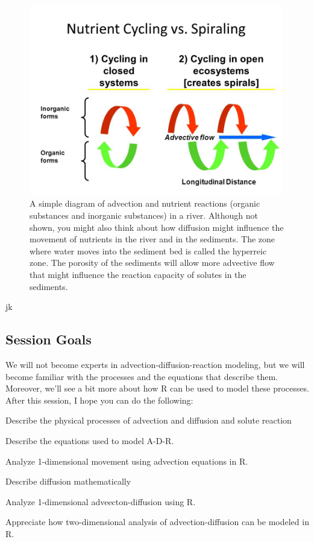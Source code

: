 \documentclass{tufte-handout}\usepackage[]{graphicx}\usepackage[]{xcolor}
\newenvironment{enumerate*}%
  {\begin{enumerate}%
    \setlength{\itemsep}{0pt}%
    \setlength{\parskip}{0pt}}%
  {\end{enumerate}}
\begin{document}
\begin{figure}
\caption{A simple diagram of advection and nutrient reactions (organic substances and inorganic substances) in a river. Although not shown, you might also think about how diffusion might influence the movement of nutrients in the river and in the sediments.  
The zone where water moves into the sediment bed is called the hyperreic zone. The porosity of the sediments will allow more advective flow that might influence the reaction capacity of solutes in the sediments.}
\label{fig:nutrientspiraling}
\centering
\includegraphics[width=0.99\textwidth]{graphics/NutrientSpiraling.jpg}
\end{figure}
jk
\subsection{Session Goals}

We will not become experts in advection-diffusion-reaction modeling, but we will become familiar with the processes and the equations that describe them. Moreover, we'll see a bit more about how R can be used to model these processes. After this session, I hope you can do the following:

\begin{enumerate*}
	\item Describe the physical processes of advection and diffusion and solute reaction
	\item Describe the equations used to model A-D-R. 
	\item Analyze 1-dimensional movement using advection equations in R.
	\item Describe diffusion mathematically
	\item Analyze 1-dimensional adveecton-diffusion using R.
	\item Appreciate how two-dimensional analysis of advection-diffusion can be modeled in R.
\end{enumerate*}
\end{document}
